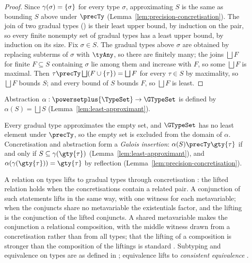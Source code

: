 \begin{proof}
Since $\gamma(\sigma) = \{\sigma\}$ for every type $\sigma$, approximating $S$ is the same as
bounding $S$ above under $\precTy$ (Lemma~\ref{lem:precision-concretisation}). The join of two
gradual types () is their least upper bound, by induction on the pair, so
every finite nonempty set of gradual types has a least upper bound, by induction on its size. Fix
$\sigma \in S$. The gradual types above $\sigma$ are obtained by replacing subterms of $\sigma$ with
$\tyAny$, so there are finitely many; the joins $\bigsqcup F$ for finite $F \subseteq S$ containing
$\sigma$ lie among them and increase with $F$, so some $\bigsqcup F$ is maximal. Then
$\tau \precTy \bigsqcup (F \cup \set{\tau}) = \bigsqcup F$ for every $\tau \in S$ by maximality, so
$\bigsqcup F$ bounds $S$; and every bound of $S$ bounds $F$, so $\bigsqcup F$ is least.
\end{proof}



\begin{definition}[Abstraction]
\label{def:abstraction}
Abstraction $\alpha : \powersetplus{\TypeSet} \to \GTypeSet$ is defined by
$\alpha(S) = \bigsqcup S$ (Lemma~\ref{lem:least-approximant}).
\end{definition}

\noindent Every gradual type approximates the empty set, and $\GTypeSet$ has no least element under
$\precTy$, so the empty set is excluded from the domain of $\alpha$. Concretisation and abstraction
form a \emph{Galois insertion}: $\alpha(S) \precTy \gty{\tau}$ if and only if
$S \subseteq \gamma(\gty{\tau})$ (Lemma~\ref{lem:least-approximant}), and
$\alpha(\gamma(\gty{\tau})) = \gty{\tau}$ by reflection
(Lemma~\ref{lem:precision-concretisation}).

A relation on types lifts to gradual types through concretisation \citep{garcia2016}: the lifted
relation holds when the concretisations contain a related pair. A conjunction of such statements
lifts in the same way, with one witness for each metavariable; when the conjuncts share no
metavariable the existentials factor, and the lifting is the conjunction of the lifted conjuncts.
A shared metavariable makes the conjunction a relational composition, with the middle witness
drawn from a concretisation rather than from all types; that the lifting of a composition is
stronger than the composition of the liftings is standard \citep{garcia2016}. Subtyping and
equivalence on types are as defined in \specification; equivalence lifts to \emph{consistent
equivalence} \citep{sekiyama2019}.

